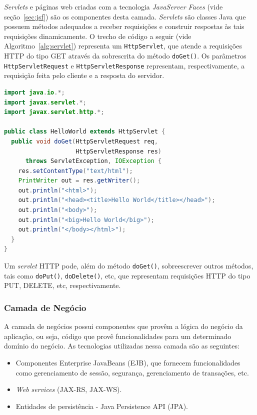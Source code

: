 \documentclass[
  10.5pt,				  %
	openright,			%
	twoside,			  %
  a5paper,
  chapter=TITLE,	%
	section=TITLE,	%
  hyphens,        %
	english,        %
	brazil          %
]{abntex2}
\renewcommand{\lstlistingname}{Algoritmo}%
\begin{document}
\emph{Servlets} e páginas web criadas com a tecnologia \emph{JavaServer Faces} (vide seção~\ref{sec:jsf}) são os componentes desta camada. \emph{Servlets} são classes Java que possuem métodos adequados a receber requisições e construir respostas às tais requisições dinamicamente. O trecho de código\cite{javaservlet} a seguir (vide \lstlistingname~\ref{alg:servlet}) representa um \texttt{HttpServlet}, que atende a requisições HTTP do tipo GET através da sobrescrita do método \texttt{doGet()}. Os parâmetros \texttt{HttpServletRequest} e \texttt{HttpServletResponse} representam, respectivamente, a requisição feita pelo cliente e a resposta do servidor.
%
\begin{lstlisting}[language=Java, caption={Um \emph{servlet} que imprime ``\emph{Hello World}''.}, label={alg:servlet}]
import java.io.*;
import javax.servlet.*;
import javax.servlet.http.*;

public class HelloWorld extends HttpServlet {
  public void doGet(HttpServletRequest req,
                    HttpServletResponse res)
      throws ServletException, IOException {
    res.setContentType("text/html");
    PrintWriter out = res.getWriter();
    out.println("<html>");
    out.println("<head><title>Hello World</title></head>");
    out.println("<body>");
    out.println("<big>Hello World</big>");
    out.println("</body></html>");
  }
}
\end{lstlisting}

Um \emph{servlet} HTTP pode, além do método \texttt{doGet()}, sobreescrever outros métodos, tais como \texttt{doPut()}, \texttt{doDelete()}, etc, que representam requisições HTTP do tipo PUT, DELETE, etc, respectivamente.


\subsubsection{Camada de Negócio}
A camada de negócios possui componentes que provêm a lógica do negócio da aplicação, ou seja, código que provê funcionalidades para um determinado domínio do negócio. As tecnologias utilizadas nessa camada são as seguintes:
\begin{itemize}
  \item Componentes Enterprise JavaBeans (EJB), que fornecem funcionalidades como gerenciamento de sessão, segurança, gerenciamento de transações, etc.
  \item \emph{Web services} (JAX-RS, JAX-WS).
  \item Entidades de persistência - Java Persistence API (JPA).
\end{itemize}
\end{document}
